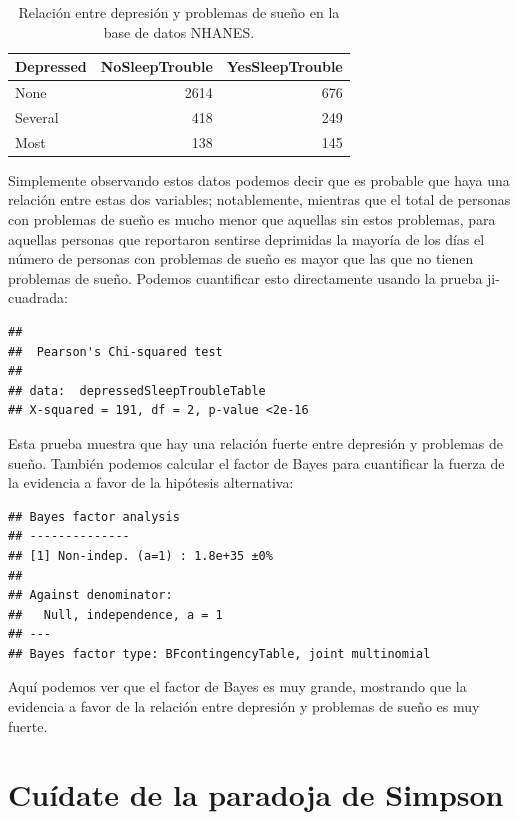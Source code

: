 \documentclass[
  12pt,
]{book}
\begin{document}
\begin{table}

\caption{\label{tab:unnamed-chunk-84}Relación entre depresión y problemas de sueño en la base de datos NHANES.}
\centering
\begin{tabular}[t]{l|r|r}
\hline
Depressed & NoSleepTrouble & YesSleepTrouble\\
\hline
None & 2614 & 676\\
\hline
Several & 418 & 249\\
\hline
Most & 138 & 145\\
\hline
\end{tabular}
\end{table}

Simplemente observando estos datos podemos decir que es probable que haya una relación entre estas dos variables; notablemente, mientras que el total de personas con problemas de sueño es mucho menor que aquellas sin estos problemas, para aquellas personas que reportaron sentirse deprimidas la mayoría de los días el número de personas con problemas de sueño es mayor que las que no tienen problemas de sueño. Podemos cuantificar esto directamente usando la prueba ji-cuadrada:

\begin{verbatim}
## 
##  Pearson's Chi-squared test
## 
## data:  depressedSleepTroubleTable
## X-squared = 191, df = 2, p-value <2e-16
\end{verbatim}

Esta prueba muestra que hay una relación fuerte entre depresión y problemas de sueño. También podemos calcular el factor de Bayes para cuantificar la fuerza de la evidencia a favor de la hipótesis alternativa:

\begin{verbatim}
## Bayes factor analysis
## --------------
## [1] Non-indep. (a=1) : 1.8e+35 ±0%
## 
## Against denominator:
##   Null, independence, a = 1 
## ---
## Bayes factor type: BFcontingencyTable, joint multinomial
\end{verbatim}

Aquí podemos ver que el factor de Bayes es muy grande, mostrando que la evidencia a favor de la relación entre depresión y problemas de sueño es muy fuerte.

\hypertarget{cuuxeddate-de-la-paradoja-de-simpson}{%
\section{Cuídate de la paradoja de Simpson}\label{cuuxeddate-de-la-paradoja-de-simpson}}
\end{document}
